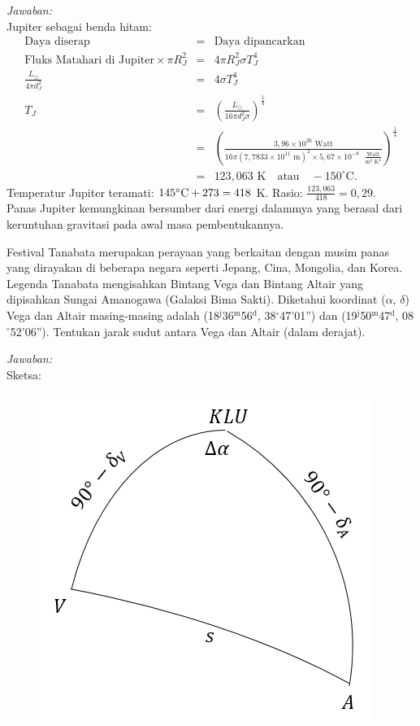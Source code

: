 \documentclass[11pt,fleqn]{exam}
\begin{document}
\begin{questions}
\textit{Jawaban:} \\
Jupiter sebagai benda hitam:
\begin{eqnarray*}
\text{Daya diserap}&=&\text{Daya dipancarkan}\\
\text{Fluks Matahari di Jupiter} \times \pi R_J^2&=&4\pi R_J^2\sigma T_J^4\\
\frac{L_{\odot}}{4\pi d_J^2}&=&4\sigma T_J^4\\
T_J&=& \left(\frac{L_{\odot}}{16\pi d_J^2\sigma} \right)^{\frac{1}{4}}\\
&=& \left(\frac{3,96\times 10^{26}\text{ Watt}}{16\pi(7,7833\times 10^{11}\text{ m})^2\times 5,67\times 10^{-8}\text{ }\frac{\text{Watt}}{\text{m}^2\text{ K}^4}} \right)^{\frac{1}{4}}\\
&=&123,063\text{ K} \quad \text{atau} \quad -150^{\circ}\text{C}.
\end{eqnarray*}
Temperatur Jupiter teramati: $145\degree\text{C}+273=418$ K. Rasio: $\frac{123,063}{418}=0,29$.\\
Panas Jupiter kemungkinan bersumber dari energi dalammya yang berasal dari keruntuhan gravitasi pada awal masa pembentukannya.

\question Festival Tanabata merupakan perayaan yang berkaitan dengan musim panas yang dirayakan di beberapa negara seperti Jepang, Cina, Mongolia, dan Korea. Legenda Tanabata mengisahkan Bintang Vega dan Bintang Altair yang dipisahkan Sungai Amanogawa (Galaksi Bima Sakti). Diketahui koordinat ($\alpha$, $\delta$) Vega dan Altair masing-masing adalah (18$^\text{j}$36$^\text{m}$56$^\text{d}$, 38$^{\circ}$47'01'') dan (19$^\text{j}$50$^\text{m}$47$^\text{d}$, 08$^{\circ}$52'06''). Tentukan jarak sudut antara Vega dan Altair (dalam derajat).

\textit{Jawaban: }\\
Sketsa:
\begin{figure}[h!]
\centering
\includegraphics[scale=0.6]{segbol.PNG}
\end{figure}


\end{questions}
\end{document}
